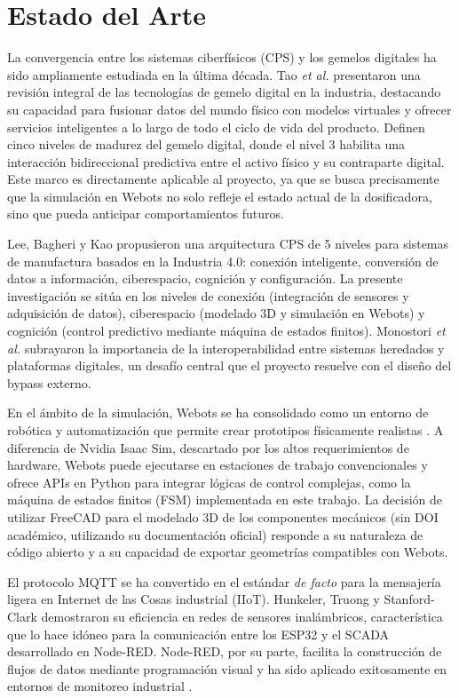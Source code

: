 \section{Estado del Arte}

La convergencia entre los sistemas ciberfísicos (CPS) y los gemelos digitales ha sido ampliamente estudiada en la última década. Tao \textit{et al.} \cite{tao2019digital} presentaron una revisión integral de las tecnologías de gemelo digital en la industria, destacando su capacidad para fusionar datos del mundo físico con modelos virtuales y ofrecer servicios inteligentes a lo largo de todo el ciclo de vida del producto. Definen cinco niveles de madurez del gemelo digital, donde el nivel 3 habilita una interacción bidireccional predictiva entre el activo físico y su contraparte digital. Este marco es directamente aplicable al proyecto, ya que se busca precisamente que la simulación en Webots no solo refleje el estado actual de la dosificadora, sino que pueda anticipar comportamientos futuros.

Lee, Bagheri y Kao \cite{lee2015architecture} propusieron una arquitectura CPS de 5 niveles para sistemas de manufactura basados en la Industria 4.0: conexión inteligente, conversión de datos a información, ciberespacio, cognición y configuración. La presente investigación se sitúa en los niveles de conexión (integración de sensores y adquisición de datos), ciberespacio (modelado 3D y simulación en Webots) y cognición (control predictivo mediante máquina de estados finitos). Monostori \textit{et al.} \cite{monostori2016cyber} subrayaron la importancia de la interoperabilidad entre sistemas heredados y plataformas digitales, un desafío central que el proyecto resuelve con el diseño del bypass externo.

En el ámbito de la simulación, Webots se ha consolidado como un entorno de robótica y automatización que permite crear prototipos físicamente realistas \cite{michel2004webots}. A diferencia de Nvidia Isaac Sim, descartado por los altos requerimientos de hardware, Webots puede ejecutarse en estaciones de trabajo convencionales y ofrece APIs en Python para integrar lógicas de control complejas, como la máquina de estados finitos (FSM) implementada en este trabajo. La decisión de utilizar FreeCAD para el modelado 3D de los componentes mecánicos \cite{freecad2024} (sin DOI académico, utilizando su documentación oficial) responde a su naturaleza de código abierto y a su capacidad de exportar geometrías compatibles con Webots.

El protocolo MQTT se ha convertido en el estándar \textit{de facto} para la mensajería ligera en Internet de las Cosas industrial (IIoT). Hunkeler, Truong y Stanford-Clark \cite{hunkeler2008mqtts} demostraron su eficiencia en redes de sensores inalámbricos, característica que lo hace idóneo para la comunicación entre los ESP32 y el SCADA desarrollado en Node-RED. Node-RED, por su parte, facilita la construcción de flujos de datos mediante programación visual y ha sido aplicado exitosamente en entornos de monitoreo industrial \cite{blackstock2014distributed}.


